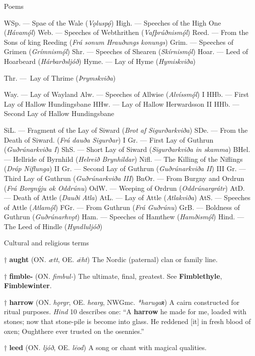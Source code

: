 Poems

WSp. — Spae of the Wale (\emph{Vǫluspǫ́})
High. — Speeches of the High One (\emph{Hávamǫ́l})
Web. — Speeches of Webthrithen (\emph{Vafþrúðnismǫ́l})
Reed. — From the Sons of king Reeding (\emph{Frá sonum Hrauðungs konungs})
Grim. — Speeches of Grimen (\emph{Grímnismǫ́l})
Shr. — Speeches of Shearen (\emph{Skírnismǫ́l})
Hoar. — Leed of Hoarbeard (\emph{Hárbarðsljóð})
Hyme. — Lay of Hyme (\emph{Hymiskviða})

Thr. — Lay of Thrime (\emph{Þrymskviða})

Way. — Lay of Wayland
Alw. — Speeches of Allwise (\emph{Alvíssmǫ́l})
I HHb. — First Lay of Hallow Hundingsbane
HHw. — Lay of Hallow Herwardsson
II HHb. — Second Lay of Hallow Hundingsbane

SiL. — Fragment of the Lay of Siward (\emph{Brot af Sigurðarkviða})
SDe. — From the Death of Siward. (\emph{Frá dauða Sigurðar})
I Gr. — First Lay of Guthrun (\emph{Guðrúnarkviða I})
ShS. — Short Lay of Siward (\emph{Sigurðarkviða in skamma})
BHel. — Hellride of Byrnhild (\emph{Helreið Brynhildar})
Nifl. — The Killing of the Niflings (\emph{Dráp Niflunga})
II Gr. — Second Lay of Guthrun (\emph{Guðrúnarkviða II})
III Gr. — Third Lay of Guthrun (\emph{Guðrúnarkviða III})
BnOr. — From Burgny and Ordrun (\emph{Frá Borgnýju ok Oddrúnu})
OdW. — Weeping of Ordrun (\emph{Oddrúnargrátr})
AtD. — Death of Attle (\emph{Dauði Atla})
AtL. — Lay of Attle (\emph{Atlakviða})
AtS. — Speeches of Attle (\emph{Atlamǫ́l})
FGr. — From Guthrun (\emph{Frá Guðrúnu})
GrB. — Boldness of Guthrun (\emph{Guðrúnarhvǫt})
Ham. — Speeches of Hamthew (\emph{Hamðismǫ́l})
Hind. — The Leed of Hindle (\emph{Hyndluljóð})



Cultural and religious terms

† \textbf{aught} (ON. \emph{ætt}, OE. \emph{ǣht})
 The Nordic (paternal) clan or family line.

† \textbf{fimble-} (ON. \emph{fimbul-})
 The ultimate, final, greatest. See \textbf{Fimblethyle}, \textbf{Fimblewinter}.

† \textbf{harrow} (ON. \emph{hǫrgr}, OE. \emph{hearg}, NWGmc. \emph{*harugaʀ})
 A cairn constructed for ritual purposes. \emph{Hind} 10 describes one: “A \textbf{harrow} he made for me, loaded with stones; now that stone-pile is become into glass. He reddened [it] in fresh blood of oxen; Oughthere ever trusted on the osennies.”

† \textbf{leed} (ON. \emph{ljóð}, OE. \emph{lēod})
 A song or chant with magical qualities.

